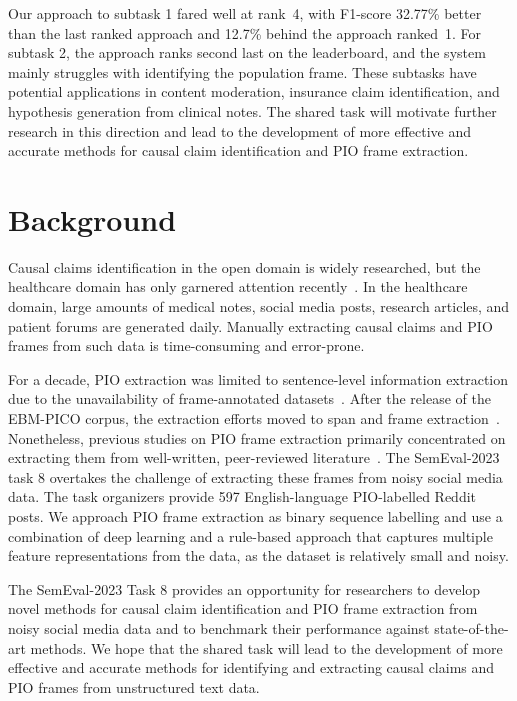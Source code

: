 \documentclass[11pt]{article}
\begin{document}
Our approach to subtask 1 fared well at rank~4, with F1-score 32.77\% better than the last ranked approach and 12.7\% behind the approach ranked~1.
For subtask 2, the approach ranks second last on the leaderboard, and the system mainly struggles with identifying the population frame.
These subtasks have potential applications in content moderation, insurance claim identification, and hypothesis generation from clinical notes.
The shared task will motivate further research in this direction and lead to the development of more effective and accurate methods for causal claim identification and PIO frame extraction.
%
%
%
\section{Background}
\label{sec:background}
%
Causal claims identification in the open domain is widely researched, but the healthcare domain has only garnered attention recently~\cite{mueller2018extracting,wang-etal-2019-identifying,parveen-etal-2021-automatic,islam-etal-2021-identifying}.
In the healthcare domain, large amounts of medical notes, social media posts, research articles, and patient forums are generated daily.
Manually extracting causal claims and PIO frames from such data is time-consuming and error-prone.


For a decade, PIO extraction was limited to sentence-level information extraction due to the unavailability of frame-annotated datasets~\cite{boudin2010combining,jin2018pico}.
After the release of the EBM-PICO corpus, the extraction efforts moved to span and frame extraction~\cite{nye2018corpus}.
Nonetheless, previous studies on PIO frame extraction primarily concentrated on extracting them from well-written, peer-reviewed literature~\cite{brockmeier2019improving,zhang2020unlocking,dhrangadhariya2021end}.
The SemEval-2023 task 8 overtakes the challenge of extracting these frames from noisy social media data.
The task organizers provide 597 English-language PIO-labelled Reddit posts.
We approach PIO frame extraction as binary sequence labelling and use a combination of deep learning and a rule-based approach that captures multiple feature representations from the data, as the dataset is relatively small and noisy.


The SemEval-2023 Task 8 provides an opportunity for researchers to develop novel methods for causal claim identification and PIO frame extraction from noisy social media data and to benchmark their performance against state-of-the-art methods.
We hope that the shared task will lead to the development of more effective and accurate methods for identifying and extracting causal claims and PIO frames from unstructured text data.
%
%
%
\end{document}
